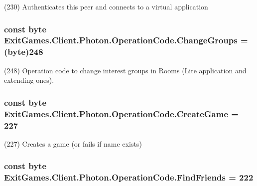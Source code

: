 (230) Authenticates this peer and connects to a virtual application

\subsubsection[{\texorpdfstring{Change\+Groups}{ChangeGroups}}]{\setlength{\rightskip}{0pt plus 5cm}const byte Exit\+Games.\+Client.\+Photon.\+Operation\+Code.\+Change\+Groups = (byte)248}\hypertarget{class_exit_games_1_1_client_1_1_photon_1_1_operation_code_ab92f32ca36b9c62c35e2e32c067e6158}{}\label{class_exit_games_1_1_client_1_1_photon_1_1_operation_code_ab92f32ca36b9c62c35e2e32c067e6158}


(248) Operation code to change interest groups in Rooms (Lite application and extending ones).

\subsubsection[{\texorpdfstring{Create\+Game}{CreateGame}}]{\setlength{\rightskip}{0pt plus 5cm}const byte Exit\+Games.\+Client.\+Photon.\+Operation\+Code.\+Create\+Game = 227}\hypertarget{class_exit_games_1_1_client_1_1_photon_1_1_operation_code_a4ec87e6ee50ba49c669644c242053854}{}\label{class_exit_games_1_1_client_1_1_photon_1_1_operation_code_a4ec87e6ee50ba49c669644c242053854}


(227) Creates a game (or fails if name exists)

\subsubsection[{\texorpdfstring{Find\+Friends}{FindFriends}}]{\setlength{\rightskip}{0pt plus 5cm}const byte Exit\+Games.\+Client.\+Photon.\+Operation\+Code.\+Find\+Friends = 222}\hypertarget{class_exit_games_1_1_client_1_1_photon_1_1_operation_code_a798a8291fd87aa865d470cd1f09f05b5}{}\label{class_exit_games_1_1_client_1_1_photon_1_1_operation_code_a798a8291fd87aa865d470cd1f09f05b5}


